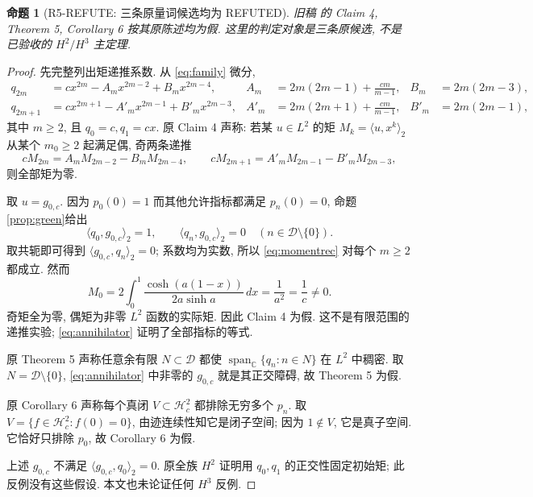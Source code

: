 \documentclass[UTF8,fontset=fandol,11pt,a4paper]{ctexart}
\newtheorem{proposition}[theorem]{命题}
\theoremstyle{definition}
\newcommand{\C}{\mathbb C}
\newcommand{\Hc}{\mathcal H_c^2}
\newcommand{\spn}{\operatorname{span}_{\C}}
\newcommand{\ip}[2]{\langle #1,#2\rangle_2}
\begin{document}
\begin{proposition}[R5-REFUTE: 三条原量词候选均为 REFUTED]\label{prop:refute}
旧稿 \cite{oldrun} 的 Claim 4, Theorem 5, Corollary 6 按其原陈述均为假.
这里的判定对象是三条原候选, 不是已验收的 $H^2/H^3$ 主定理.
\end{proposition}

\begin{proof}
先完整列出矩递推系数. 从 \eqref{eq:family} 微分,
\begin{align*}
q_{2m}&=cx^{2m}-A_mx^{2m-2}+B_mx^{2m-4},&
A_m&=2m(2m-1)+\frac{cm}{m-1},& B_m&=2m(2m-3),\\
q_{2m+1}&=cx^{2m+1}-A'_mx^{2m-1}+B'_mx^{2m-3},&
A'_m&=2m(2m+1)+\frac{cm}{m-1},& B'_m&=2m(2m-1),
\end{align*}
其中 $m\ge2$, 且 $q_0=c,q_1=cx$.
原 Claim 4 声称: 若某 $u\in L^2$ 的矩 $M_k=\ip{u}{x^k}$
从某个 $m_0\ge2$ 起满足偶, 奇两条递推
\begin{equation}\label{eq:momentrec}
cM_{2m}=A_mM_{2m-2}-B_mM_{2m-4},\qquad
cM_{2m+1}=A'_mM_{2m-1}-B'_mM_{2m-3},
\end{equation}
则全部矩为零.

取 $u=g_{0,c}$. 因为 $p_0(0)=1$ 而其他允许指标都满足 $p_n(0)=0$,
命题\ref{prop:green}给出
\begin{equation}\label{eq:annihilator}
\ip{q_0}{g_{0,c}}=1,\qquad
\ip{q_n}{g_{0,c}}=0\quad(n\in\mathcal D\setminus\{0\}).
\end{equation}
取共轭即可得到 $\ip{g_{0,c}}{q_n}=0$; 系数均为实数, 所以
\eqref{eq:momentrec} 对每个 $m\ge2$ 都成立. 然而
\begin{equation}\label{eq:mzero}
M_0=2\int_0^1\frac{\cosh(a(1-x))}{2a\sinh a}\,dx
=\frac1{a^2}=\frac1c\ne0.
\end{equation}
奇矩全为零, 偶矩为非零 $L^2$ 函数的实际矩. 因此 Claim 4 为假.
这不是有限范围的递推实验; \eqref{eq:annihilator} 证明了全部指标的等式.

原 Theorem 5 声称任意余有限 $N\subset\mathcal D$ 都使
$\spn\{q_n:n\in N\}$ 在 $L^2$ 中稠密.
取 $N=\mathcal D\setminus\{0\}$, \eqref{eq:annihilator} 中非零的
$g_{0,c}$ 就是其正交障碍, 故 Theorem 5 为假.

原 Corollary 6 声称每个真闭 $V\subset\Hc$ 都排除无穷多个 $p_n$.
取 $V=\{f\in\Hc:f(0)=0\}$, 由迹连续性知它是闭子空间;
因为 $1\notin V$, 它是真子空间. 它恰好只排除 $p_0$, 故 Corollary 6 为假.

上述 $g_{0,c}$ 不满足 $\ip{g_{0,c}}{q_0}=0$.
原全族 $H^2$ 证明用 $q_0,q_1$ 的正交性固定初始矩;
此反例没有这些假设. 本文也未论证任何 $H^3$ 反例.
\end{proof}
\end{document}
